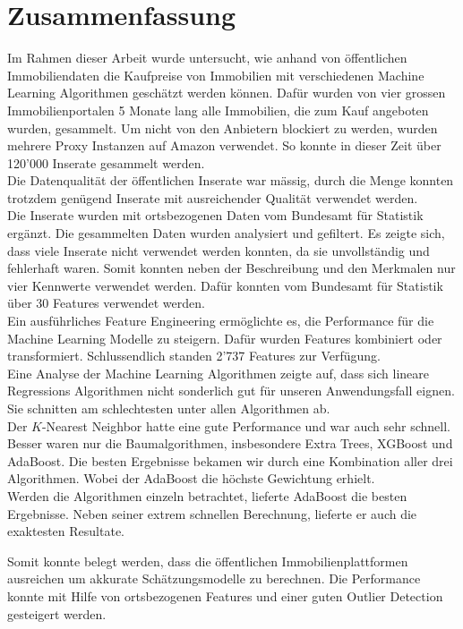 \section{Zusammenfassung}
Im Rahmen dieser Arbeit wurde untersucht, wie anhand von öffentlichen Immobiliendaten die Kaufpreise von Immobilien mit verschiedenen Machine Learning Algorithmen geschätzt werden können. Dafür wurden von vier grossen Immobilienportalen 5 Monate lang alle Immobilien, die zum Kauf angeboten wurden, gesammelt. Um nicht von den Anbietern blockiert zu werden, wurden mehrere Proxy Instanzen auf Amazon verwendet. So konnte in dieser Zeit über 120’000 Inserate gesammelt werden.\\
Die Datenqualität der öffentlichen Inserate war mässig, durch die Menge konnten trotzdem genügend Inserate mit ausreichender Qualität verwendet werden.\\
Die Inserate wurden mit ortsbezogenen Daten vom Bundesamt für Statistik ergänzt. Die gesammelten Daten wurden analysiert und gefiltert. Es zeigte sich, dass viele Inserate nicht verwendet werden konnten, da sie unvollständig und fehlerhaft waren. Somit konnten neben der Beschreibung und den Merkmalen nur vier Kennwerte verwendet werden. Dafür konnten vom Bundesamt für Statistik über 30 Features verwendet werden.\\
Ein ausführliches Feature Engineering ermöglichte es, die Performance für die Machine Learning Modelle zu steigern. Dafür wurden Features kombiniert oder transformiert. Schlussendlich standen 2'737 Features zur Verfügung.\\
Eine Analyse der Machine Learning Algorithmen zeigte auf, dass sich lineare Regressions Algorithmen nicht sonderlich gut für unseren Anwendungsfall eignen. Sie schnitten am schlechtesten unter allen Algorithmen ab.\\
Der $K$-Nearest Neighbor hatte eine gute Performance und war auch sehr schnell. Besser waren nur die Baumalgorithmen, insbesondere Extra Trees, XGBoost und AdaBoost. Die besten Ergebnisse bekamen wir durch eine Kombination aller drei Algorithmen. Wobei der AdaBoost die höchste Gewichtung erhielt.\\
Werden die Algorithmen einzeln betrachtet, lieferte AdaBoost die besten Ergebnisse. Neben seiner extrem schnellen Berechnung, lieferte er auch die exaktesten Resultate.

Somit konnte belegt werden, dass die öffentlichen Immobilienplattformen ausreichen um akkurate Schätzungsmodelle zu berechnen. Die Performance konnte mit Hilfe von ortsbezogenen Features und einer guten Outlier Detection gesteigert werden.
